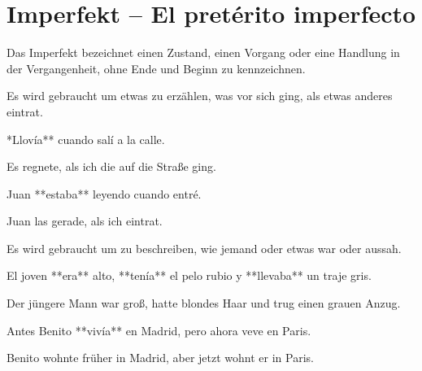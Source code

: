 \section*{Imperfekt -- El pretérito imperfecto}

Das Imperfekt bezeichnet einen Zustand, einen Vorgang oder eine Handlung in der Vergangenheit, ohne Ende
und Beginn zu kennzeichnen.


\begin{highlight}
    Es wird gebraucht um etwas zu erzählen, was vor sich ging, als etwas anderes eintrat.
\end{highlight}

\begin{compactitem}
    \item  **Llovía** cuando salí a la calle.
    \begin{compactitem}\itshape
        \item Es regnete, als ich die auf die Straße ging.
    \end{compactitem}
    \item Juan **estaba** leyendo cuando entré.
    \begin{compactitem}\itshape
        \item Juan las gerade, als ich eintrat.
    \end{compactitem}
\end{compactitem}


\begin{highlight}
    Es wird gebraucht um zu beschreiben, wie jemand oder etwas war oder aussah.
\end{highlight}

\begin{compactitem}
    \item  El joven **era** alto, **tenía** el pelo rubio y **llevaba** un traje gris.
    \begin{compactitem}\itshape
        \item Der  jüngere Mann war groß, hatte blondes Haar und trug einen grauen Anzug.
    \end{compactitem}
    \item Antes Benito **vivía** en Madrid, pero ahora veve en Paris.
    \begin{compactitem}\itshape
        \item Benito wohnte früher in Madrid, aber jetzt wohnt er in Paris.
    \end{compactitem}
\end{compactitem}


